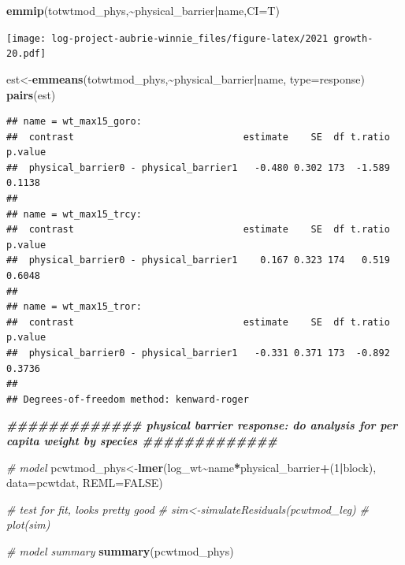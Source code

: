 \documentclass[
]{article}
\newenvironment{Shaded}{\begin{snugshade}}{\end{snugshade}}
\newcommand{\AttributeTok}[1]{\textcolor[rgb]{0.13,0.29,0.53}{#1}}
\newcommand{\CommentTok}[1]{\textcolor[rgb]{0.56,0.35,0.01}{\textit{#1}}}
\newcommand{\ConstantTok}[1]{\textcolor[rgb]{0.56,0.35,0.01}{#1}}
\newcommand{\DecValTok}[1]{\textcolor[rgb]{0.00,0.00,0.81}{#1}}
\newcommand{\DocumentationTok}[1]{\textcolor[rgb]{0.56,0.35,0.01}{\textbf{\textit{#1}}}}
\newcommand{\FunctionTok}[1]{\textcolor[rgb]{0.13,0.29,0.53}{\textbf{#1}}}
\newcommand{\NormalTok}[1]{#1}
\newcommand{\OtherTok}[1]{\textcolor[rgb]{0.56,0.35,0.01}{#1}}
\newcommand{\SpecialCharTok}[1]{\textcolor[rgb]{0.81,0.36,0.00}{\textbf{#1}}}
\newcommand{\StringTok}[1]{\textcolor[rgb]{0.31,0.60,0.02}{#1}}
\begin{document}
\begin{Shaded}
\begin{Highlighting}[]
\FunctionTok{emmip}\NormalTok{(totwtmod\_phys,}\SpecialCharTok{\textasciitilde{}}\NormalTok{physical\_barrier}\SpecialCharTok{|}\NormalTok{name,}\AttributeTok{CI=}\NormalTok{T)}
\end{Highlighting}
\end{Shaded}

\texttt{[image: log-project-aubrie-winnie\_files/figure-latex/2021 growth-20.pdf]}

\begin{Shaded}
\begin{Highlighting}[]
\NormalTok{est}\OtherTok{\textless{}{-}}\FunctionTok{emmeans}\NormalTok{(totwtmod\_phys,}\SpecialCharTok{\textasciitilde{}}\NormalTok{physical\_barrier}\SpecialCharTok{|}\NormalTok{name, }\AttributeTok{type=}\StringTok{\textquotesingle{}response\textquotesingle{}}\NormalTok{)}
\FunctionTok{pairs}\NormalTok{(est)}
\end{Highlighting}
\end{Shaded}

\begin{verbatim}
## name = wt_max15_goro:
##  contrast                              estimate    SE  df t.ratio p.value
##  physical_barrier0 - physical_barrier1   -0.480 0.302 173  -1.589  0.1138
## 
## name = wt_max15_trcy:
##  contrast                              estimate    SE  df t.ratio p.value
##  physical_barrier0 - physical_barrier1    0.167 0.323 174   0.519  0.6048
## 
## name = wt_max15_tror:
##  contrast                              estimate    SE  df t.ratio p.value
##  physical_barrier0 - physical_barrier1   -0.331 0.371 173  -0.892  0.3736
## 
## Degrees-of-freedom method: kenward-roger
\end{verbatim}

\begin{Shaded}
\begin{Highlighting}[]
\DocumentationTok{\#\#\#\#\#\#\#\#\#\#\#\#\# physical barrier response: do analysis for per capita weight by species \#\#\#\#\#\#\#\#\#\#\#\#\# }

\CommentTok{\# model}
\NormalTok{pcwtmod\_phys}\OtherTok{\textless{}{-}}\FunctionTok{lmer}\NormalTok{(log\_wt}\SpecialCharTok{\textasciitilde{}}\NormalTok{name}\SpecialCharTok{*}\NormalTok{physical\_barrier}\SpecialCharTok{+}\NormalTok{(}\DecValTok{1}\SpecialCharTok{|}\NormalTok{block), }\AttributeTok{data=}\NormalTok{pcwtdat, }\AttributeTok{REML=}\ConstantTok{FALSE}\NormalTok{) }

\CommentTok{\# test for fit, looks pretty good}
\CommentTok{\# sim\textless{}{-}simulateResiduals(pcwtmod\_leg)}
\CommentTok{\# plot(sim)}

\CommentTok{\# model summary}
\FunctionTok{summary}\NormalTok{(pcwtmod\_phys)}
\end{Highlighting}
\end{Shaded}
\end{document}
